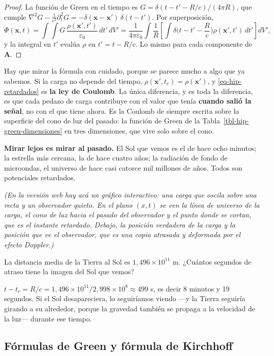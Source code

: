 \documentclass[
  spanish,
  a4paper,
]{scrbook}
\theoremstyle{definition}
\theoremstyle{plain}
\theoremstyle{definition}
\theoremstyle{plain}
\theoremstyle{definition}
\theoremstyle{remark}
\begin{document}
\begin{proof}
La función de Green en el tiempo es
\(G = \delta(t - t' - R/c)/(4\pi R)\), que cumple
\(\nabla^2G - \tfrac1{c^2}\partial_t^2G = -\delta(\mathbf x-\mathbf x')\,\delta(t-t')\).
Por superposición, \[
\Phi(\mathbf x,t) = \int\!\!\int G\,\frac{\rho(\mathbf x',t')}{\varepsilon_0}\,dt'\,dV'
= \frac{1}{4\pi\varepsilon_0}\int\frac{1}{R}\left[\int\delta\Big(t-t'-\frac Rc\Big)\rho(\mathbf x',t')\,dt'\right]dV',
\] y la integral en \(t'\) evalúa \(\rho\) en \(t' = t - R/c\). Lo mismo
para cada componente de \(\mathbf A\).
\end{proof}

Hay que mirar la fórmula con cuidado, porque se parece mucho a algo que
ya sabemos. Si la carga no depende del tiempo,
\(\rho(\mathbf x', t_r) = \rho(\mathbf x')\), y \ref{eq-hip-retardados}
es \textbf{la ley de Coulomb}. La única diferencia, y es toda la
diferencia, es que cada pedazo de carga contribuye con el valor que
tenía \textbf{cuando salió la señal}, no con el que tiene ahora. Es la
Coulomb de siempre escrita sobre la superficie del cono de luz del
pasado: la función de Green de la Tabla~\ref{tbl-hip-green-dimensiones}
en tres dimensiones, que vive solo sobre el cono.

\textbf{Mirar lejos es mirar al pasado.} El Sol que vemos es el de hace
ocho minutos; la estrella más cercana, la de hace cuatro años; la
radiación de fondo de microondas, el universo de hace casi catorce mil
millones de años. Todos son potenciales retardados.

\emph{(En la versión web hay acá un gráfico interactivo: una carga que
oscila sobre una recta y un observador quieto. En el plano \((x,t)\) se
ven la línea de universo de la carga, el cono de luz hacia el pasado del
observador y el punto donde se cortan, que es el instante retardado.
Debajo, la posición verdadera de la carga y la posición que ve el
observador, que es una copia atrasada y deformada por el efecto
Doppler.)}

La distancia media de la Tierra al Sol es \(1{,}496\times10^{11}\) m.
¿Cuántos segundos de atraso tiene la imagen del Sol que vemos?

\(t - t_r = R/c = 1{,}496\times10^{11}/2{,}998\times10^8 \approx 499\)
s, es decir 8 minutos y 19 segundos. Si el Sol desapareciera, lo
seguiríamos viendo ---y la Tierra seguiría girando a su alrededor,
porque la gravedad también se propaga a la velocidad de la luz---
durante ese tiempo.

\subsection{Fórmulas de Green y fórmula de
Kirchhoff}\label{sec-hip-kirchhoff}
\end{document}
